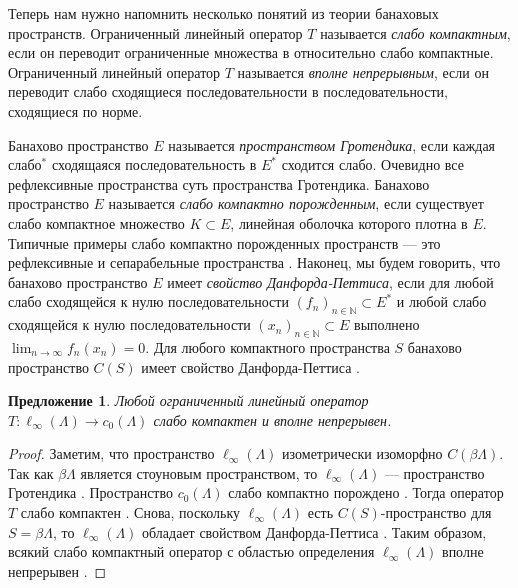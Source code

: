 \documentclass[12pt]{article}
\newtheorem{proposition}[theorem]{Предложение}
\begin{document}
Теперь нам нужно напомнить несколько понятий из теории банаховых пространств. Ограниченный линейный оператор $T$ называется \textit{слабо компактным}, если он переводит ограниченные множества в относительно слабо компактные. Ограниченный линейный оператор $T$ называется \textit{вполне непрерывным}, если он переводит слабо сходящиеся последовательности в последовательности, сходящиеся по норме.

Банахово пространство $E$ называется \textit{пространством Гротендика}, если каждая слабо$^*$ сходящаяся последовательность в $E^*$ сходится слабо. Очевидно все рефлексивные пространства суть пространства Гротендика. Банахово пространство $E$ называется \textit{слабо компактно порожденным}, если существует слабо компактное множество $K\subset E$, линейная оболочка которого плотна в $E$. Типичные примеры слабо компактно порожденных пространств --- это рефлексивные и сепарабельные пространства \cite[параграф 13.1]{FabHabBanSpTh}. Наконец, мы будем говорить, что банахово пространство $E$ имеет \textit{свойство Данфорда-Петтиса}, если для любой слабо сходящейся к нулю последовательности  $(f_n)_{n\in\mathbb{N}}\subset E^*$ и любой слабо сходящейся к нулю последовательности $(x_n)_{n\in\mathbb{N}}\subset E$ выполнено $\lim_{n\to\infty} f_n(x_n)=0$. Для любого компактного пространства $S$ банахово пространство $C(S)$ имеет свойство Данфорда-Петтиса \cite{DunfPetLinOpSumFunc}.

\begin{proposition}\label{OpLInfc0CompContWeakComp} Любой ограниченный линейный оператор $T:\ell_\infty(\Lambda)\to c_0(\Lambda)$ слабо компактен и вполне непрерывен.
\end{proposition}
\begin{proof} Заметим, что пространство $\ell_\infty(\Lambda)$ изометрически изоморфно $C(\beta\Lambda)$. Так как $\beta\Lambda$ является стоуновым пространством, то $\ell_\infty(\Lambda)$ --- пространство Гротендика \cite[теорема 9, стр. 168]{GrothApplFabilCompCK}. Пространство $c_0(\Lambda)$ слабо компактно порождено \cite[параграф 13.1 пример (iii)]{FabHabBanSpTh}. Тогда оператор $T$ слабо компактен \cite[пример 13.33]{FabHabBanSpTh}. Снова, поскольку $\ell_\infty(\Lambda)$ есть $C(S)$-пространство для $S=\beta\Lambda$, то $\ell_\infty(\Lambda)$ обладает свойством Данфорда-Петтиса \cite[теорема 13.43]{FabHabBanSpTh}. Таким образом, всякий слабо компактный оператор с областью определения $\ell_\infty(\Lambda)$ вполне непрерывен \cite[предложение 13.42]{FabHabBanSpTh}.
\end{proof}
\end{document}
